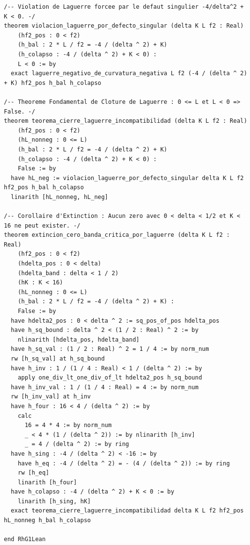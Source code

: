 \documentclass[11pt,a4paper]{article}
\theoremstyle{definition}
\theoremstyle{remark}
\begin{document}
\begin{lstlisting}[language=Lean4]
/-- Violation de Laguerre forcee par le defaut singulier -4/delta^2 + K < 0. -/
theorem violacion_laguerre_por_defecto_singular (delta K L f2 : Real)
    (hf2_pos : 0 < f2)
    (h_bal : 2 * L / f2 = -4 / (delta ^ 2) + K)
    (h_colapso : -4 / (delta ^ 2) + K < 0) :
    L < 0 := by
  exact laguerre_negativo_de_curvatura_negativa L f2 (-4 / (delta ^ 2) + K) hf2_pos h_bal h_colapso

/-- Theoreme Fondamental de Cloture de Laguerre : 0 <= L et L < 0 => False. -/
theorem teorema_cierre_laguerre_incompatibilidad (delta K L f2 : Real)
    (hf2_pos : 0 < f2)
    (hL_nonneg : 0 <= L)
    (h_bal : 2 * L / f2 = -4 / (delta ^ 2) + K)
    (h_colapso : -4 / (delta ^ 2) + K < 0) :
    False := by
  have hL_neg := violacion_laguerre_por_defecto_singular delta K L f2 hf2_pos h_bal h_colapso
  linarith [hL_nonneg, hL_neg]

/-- Corollaire d'Extinction : Aucun zero avec 0 < delta < 1/2 et K < 16 ne peut exister. -/
theorem extincion_cero_banda_critica_por_laguerre (delta K L f2 : Real)
    (hf2_pos : 0 < f2)
    (hdelta_pos : 0 < delta)
    (hdelta_band : delta < 1 / 2)
    (hK : K < 16)
    (hL_nonneg : 0 <= L)
    (h_bal : 2 * L / f2 = -4 / (delta ^ 2) + K) :
    False := by
  have hdelta2_pos : 0 < delta ^ 2 := sq_pos_of_pos hdelta_pos
  have h_sq_bound : delta ^ 2 < (1 / 2 : Real) ^ 2 := by
    nlinarith [hdelta_pos, hdelta_band]
  have h_sq_val : (1 / 2 : Real) ^ 2 = 1 / 4 := by norm_num
  rw [h_sq_val] at h_sq_bound
  have h_inv : 1 / (1 / 4 : Real) < 1 / (delta ^ 2) := by
    apply one_div_lt_one_div_of_lt hdelta2_pos h_sq_bound
  have h_inv_val : 1 / (1 / 4 : Real) = 4 := by norm_num
  rw [h_inv_val] at h_inv
  have h_four : 16 < 4 / (delta ^ 2) := by
    calc
      16 = 4 * 4 := by norm_num
      _ < 4 * (1 / (delta ^ 2)) := by nlinarith [h_inv]
      _ = 4 / (delta ^ 2) := by ring
  have h_sing : -4 / (delta ^ 2) < -16 := by
    have h_eq : -4 / (delta ^ 2) = - (4 / (delta ^ 2)) := by ring
    rw [h_eq]
    linarith [h_four]
  have h_colapso : -4 / (delta ^ 2) + K < 0 := by
    linarith [h_sing, hK]
  exact teorema_cierre_laguerre_incompatibilidad delta K L f2 hf2_pos hL_nonneg h_bal h_colapso

end RhG1Lean
\end{lstlisting}
\end{document}
